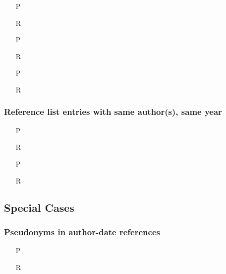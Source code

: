 \documentclass[11pt,letterpaper,oneside]{article}
\begin{document}
\begin{itemize}
\item[P] 

\item[R] 

\item[P] 

\item[R] 

\item[P] 

\item[R] 
\end{itemize}

\setcounter{subsubsection}{18}
\subsubsection{Reference list entries with same author(s), same year}
\label{15.19}

\begin{itemize}
\item[P] \parencite[218]{fogel2004b}

\item[R] 

\item[P] \parencite[45--46]{fogel2004a}

\item[R] 
\end{itemize}

\setcounter{subsection}{1}
\subsection{Special Cases}
\setcounter{subsection}{15}

\setcounter{subsubsection}{33}
\subsubsection{Pseudonyms in author-date references}

\begin{itemize}
\item[P] 

\item[R] 
\end{itemize}
\end{document}
